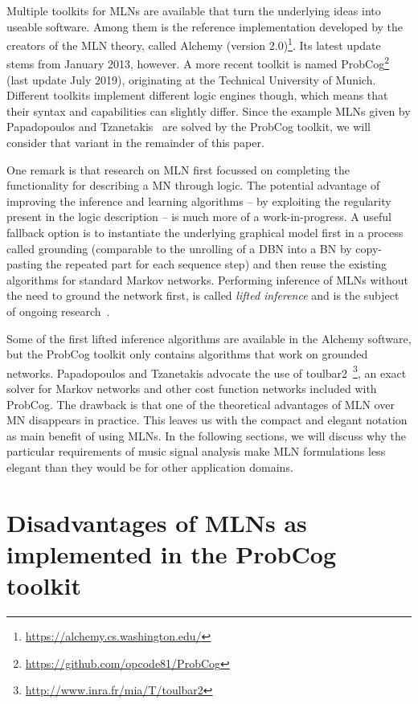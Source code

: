 \documentclass[letterpaper]{article} %
\begin{document}
Multiple toolkits for MLNs are available that turn the underlying ideas into useable software. Among them is the reference implementation developed by the creators of the MLN theory, called Alchemy (version 2.0)\footnote{\url{https://alchemy.cs.washington.edu/}}. Its latest update stems from January 2013, however. A more recent toolkit is named ProbCog\footnote{\url{https://github.com/opcode81/ProbCog}} (last update July 2019), originating at the Technical University of Munich. Different toolkits implement different logic engines though, which means that their syntax and capabilities can slightly differ. Since the example MLNs given by Papadopoulos and Tzanetakis~\cite{papadopoulos2012ismir,papadopoulos2013icassp} are solved by the ProbCog toolkit, we will consider that variant in the remainder of this paper.

One remark is that research on MLN first focussed on completing the functionality for describing a MN through logic. The potential advantage of improving the inference and learning algorithms -- by exploiting the regularity present in the logic description -- is much more of a work-in-progress. A useful fallback option is to instantiate the underlying graphical model first in a process called grounding (comparable to the unrolling of a DBN into a BN by copy-pasting the repeated part for each sequence step) and then reuse the existing algorithms for standard Markov networks. Performing inference of MLNs without the need to ground the network first, is called \emph{lifted inference} and is the subject of ongoing research~\cite{braz2005ijcai,singla2008aaai,gogate2011uai}. 

Some of the first lifted inference algorithms are available in the Alchemy software, but the ProbCog toolkit only contains algorithms that work on grounded networks. Papadopoulos and Tzanetakis advocate the use of toulbar2~\footnote{\url{http://www.inra.fr/mia/T/toulbar2}}, an exact solver for Markov networks and other cost function networks included with ProbCog. The drawback is that one of the theoretical advantages of MLN over MN disappears in practice. This leaves us with the compact and elegant notation as main benefit of using MLNs. In the following sections, we will discuss why the particular requirements of music signal analysis make MLN formulations less elegant than they would be for other application domains.


\section{Disadvantages of MLNs as implemented in the ProbCog toolkit}
\end{document}
